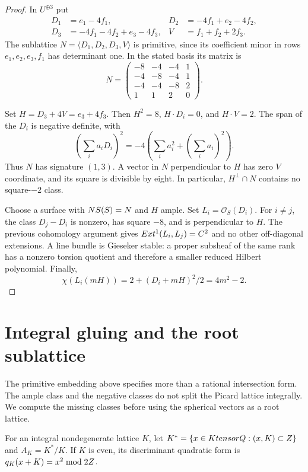 \begin{proof}
In $U^{\oplus3}$ put
\[
\begin{aligned}
D_1&=e_1-4f_1,&
D_2&=-4f_1+e_2-4f_2,\\
D_3&=-4f_1-4f_2+e_3-4f_3,&
V&=f_1+f_2+2f_3.
\end{aligned}
\]
The sublattice $N=\langle D_1,D_2,D_3,V\rangle$ is primitive, since
its coefficient minor in rows $e_1,e_2,e_3,f_1$ has determinant one.
In the stated basis its matrix is
\[
N=\begin{pmatrix}
-8&-4&-4&1\\-4&-8&-4&1\\-4&-4&-8&2\\1&1&2&0
\end{pmatrix}.
\]

Set $H=D_3+4V=e_3+4f_3$.  Then $H^2=8$, $H\cdot D_i=0$, and
$H\cdot V=2$.  The span of the $D_i$ is negative definite, with
\[
\left(\sum_i a_iD_i\right)^2
=-4\left(\sum_i a_i^2+\left(\sum_i a_i\right)^2\right).
\]
Thus $N$ has signature $(1,3)$.  A vector in $N$ perpendicular to
$H$ has zero $V$ coordinate, and its square is divisible by eight.
In particular, $H^\perp\cap N$ contains no square-$-2$ class.

Choose a surface with $NS(S)=N$ and $H$ ample.  Set
$L_i=\mathcal O_S(D_i)$.  For $i\ne j$, the class $D_j-D_i$ is
nonzero, has square $-8$, and is perpendicular to $H$.  The previous
cohomology argument gives $Ext^1(L_i,L_j)=C^2$ and no other
off-diagonal extensions.  A line bundle is Gieseker stable: a proper
subsheaf of the same rank has a nonzero torsion quotient and therefore
a smaller reduced Hilbert polynomial.  Finally,
\[
\chi(L_i(mH))=2+(D_i+mH)^2/2=4m^2-2.
\]
\end{proof}

\section{Integral gluing and the root sublattice}
\label{k3:sec:gluing}

The primitive embedding above specifies more than a rational
intersection form.  The ample class and the negative classes do not
split the Picard lattice integrally.  We compute the missing classes
before using the spherical vectors as a root lattice.

For an integral nondegenerate lattice $K$, let
$K^*=\{x\in KtensorQ:(x,K)\subset Z\}$ and
$A_K=K^*/K$.  If $K$ is even, its discriminant quadratic form is
$q_K(x+K)=x^2\bmod 2Z$.

